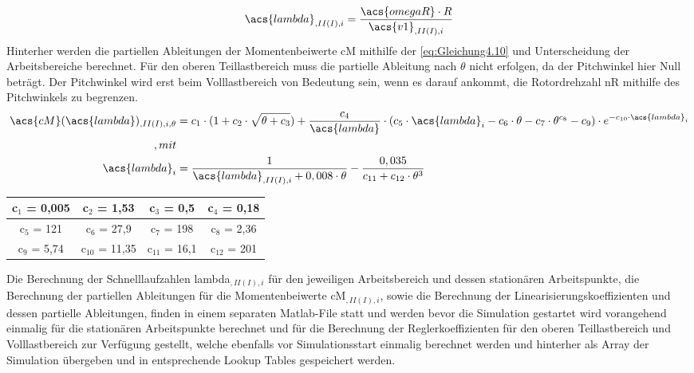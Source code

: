\begin{align}
    \acs{lambda}_{,II(I),i} = \frac{\acs{omegaR} \cdot R}{\acs{v1}_{,II(I),i}}
    \label{eq:Gleichung4.9}
\end{align}
\newline
Hinterher werden die partiellen Ableitungen der Momentenbeiwerte \acs{cM} mithilfe der \autoref{eq:Gleichung4.10} und Unterscheidung der Arbeitsbereiche berechnet. Für den oberen Teillastbereich muss die partielle Ableitung nach $\theta$ nicht erfolgen, da der Pitchwinkel hier Null beträgt. Der Pitchwinkel wird erst beim Volllastbereich von Bedeutung sein, wenn es darauf ankommt, die Rotordrehzahl \acs{nR} mithilfe des Pitchwinkels zu begrenzen.
\begin{align}
    \acs{cM}(\acs{lambda})_{,II(I),i,\theta} &= c_1 \cdot (1 + c_2 \cdot \sqrt{\theta + c_3}) + \frac{c_4}{\acs{lambda}}   \cdot (c_5 \cdot \acs{lambda}_i - c_6 \cdot \theta - c_7 \cdot \theta^{c_8} - c_9) \cdot e^{-c_{10} \cdot \acs{lambda}_i}
    \label{eq:Gleichung4.10}\\\enspace ,mit\nonumber\\
    \acs{lambda}_i &= \frac{1}{\acs{lambda}_{,II(I),i} + 0,008 \cdot \theta} - \frac{0,035}{c_{11} + c_{12} \cdot \theta^3}
    \nonumber
\end{align}

{\renewcommand{\arraystretch}{2}%
\begin{table}[H]
    \centering
    \begin{tabular}{|c|c|c|c|}
        \hline
        c$_1$ = 0,005 & c$_2$ = 1,53 & c$_3$ = 0,5 & c$_4$ = 0,18\\\hline
        c$_5$ = 121 & c$_6$ = 27,9 & c$_7$ = 198 & c$_8$ = 2,36\\\hline
        c$_9$ = 5,74& c$_{10}$ = 11,35 & c$_{11}$ = 16,1 & c$_{12}$ = 201\\\hline
    \end{tabular}
\end{table}
}

Die Berechnung der Schnelllaufzahlen \acs{lambda}$_{,II(I),i}$ für den jeweiligen Arbeitsbereich und dessen stationären Arbeitspunkte, die Berechnung der partiellen Ableitungen für die Momentenbeiwerte \acs{cM}$_{,II(I),i}$, sowie die Berechnung der Linearisierungskoeffizienten und dessen partielle Ableitungen, finden in einem separaten Matlab-File statt und werden bevor die Simulation gestartet wird vorangehend einmalig für die stationären Arbeitspunkte berechnet und für die Berechnung der Reglerkoeffizienten für den oberen Teillastbereich und Volllastbereich zur Verfügung gestellt, welche ebenfalls vor Simulationsstart einmalig berechnet werden und hinterher als Array der Simulation übergeben und in entsprechende Lookup Tables gespeichert werden.

